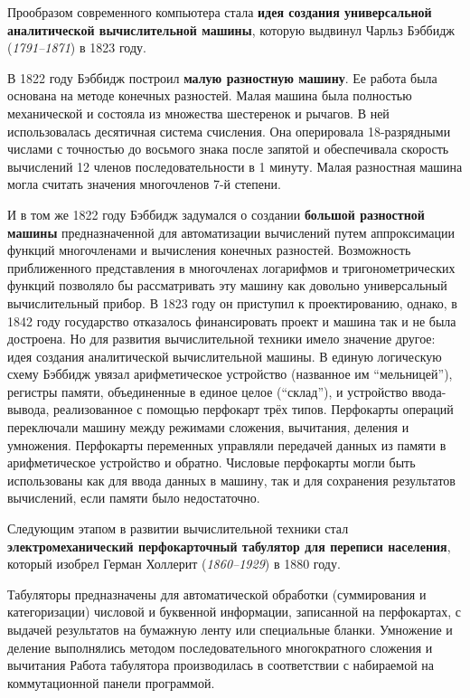 Прообразом современного компьютера стала \textbf{идея создания универсальной аналитической вычислительной машины}, которую выдвинул Чарльз Бэббидж (\emph{1791--1871}) в 1823 году.

\bigskip
В 1822 году Бэббидж построил \textbf{малую разностную машину}. Ее работа была основана на методе конечных разностей. Малая машина была полностью механической и состояла из множества шестеренок и рычагов. В ней использовалась десятичная система счисления. Она оперировала 18-разрядными числами с точностью до восьмого знака после запятой и обеспечивала скорость вычислений 12 членов последовательности в 1 минуту. Малая разностная машина могла считать значения многочленов 7-й степени.

\bigskip
И в том же 1822 году Бэббидж задумался о создании \textbf{большой разностной машины} предназначенной для автоматизации вычислений путем аппроксимации функций многочленами и вычисления конечных разностей.
Возможность приближенного представления в многочленах логарифмов и тригонометрических функций позволяло бы рассматривать эту машину как довольно универсальный вычислительный прибор.
В 1823 году он приступил к проектированию, однако, в 1842 году государство отказалось финансировать проект и машина так и не была достроена.
Но для развития вычислительной техники имело значение другое: идея создания аналитической вычислительной машины.
В единую логическую схему Бэббидж увязал арифметическое устройство (названное им \enquote{мельницей}), регистры памяти, объединенные в единое целое (\enquote{склад}), и устройство ввода-вывода, реализованное с помощью перфокарт трёх типов.
Перфокарты операций переключали машину между режимами сложения, вычитания, деления и умножения.
Перфокарты переменных управляли передачей данных из памяти в арифметическое устройство и обратно.
Числовые перфокарты могли быть использованы как для ввода данных в машину, так и для сохранения результатов вычислений, если памяти было недостаточно.

\bigskip
Следующим этапом в развитии вычислительной техники стал \textbf{электромеханический перфокарточный табулятор для переписи населения}, который изобрел Герман Холлерит (\emph{1860--1929}) в 1880 году.

Табуляторы предназначены для автоматической обработки (суммирования и категоризации) числовой и буквенной информации, записанной на перфокартах, с выдачей результатов на бумажную ленту или специальные бланки.
Умножение и деление выполнялись методом последовательного многократного сложения и вычитания
Работа табулятора производилась в соответствии с набираемой на коммутационной панели программой.


